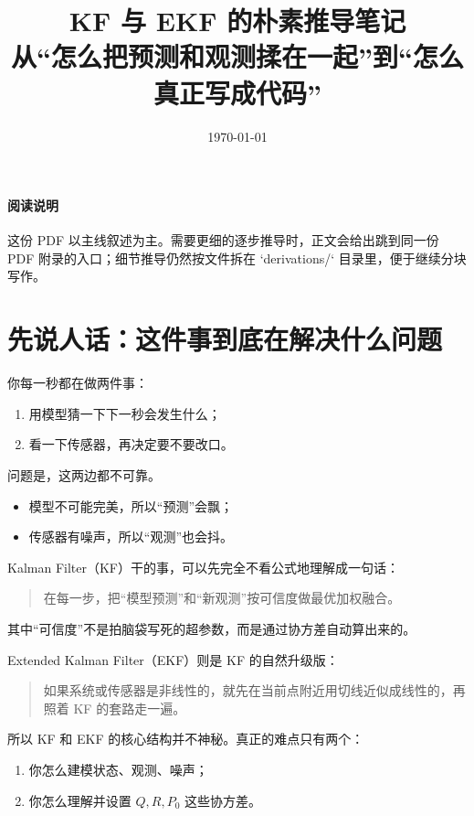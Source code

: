 \documentclass[12pt,a4paper]{ctexart}
\title{KF 与 EKF 的朴素推导笔记\\
\large 从“怎么把预测和观测揉在一起”到“怎么真正写成代码”}
\author{}
\date{\today}
\begin{document}
\maketitle

\tableofcontents

\paragraph{阅读说明}
这份 PDF 以主线叙述为主。需要更细的逐步推导时，正文会给出跳到同一份 PDF 附录的入口；细节推导仍然按文件拆在 `derivations/` 目录里，便于继续分块写作。

\section{先说人话：这件事到底在解决什么问题}

你每一秒都在做两件事：

\begin{enumerate}
  \item 用模型猜一下下一秒会发生什么；
  \item 看一下传感器，再决定要不要改口。
\end{enumerate}

问题是，这两边都不可靠。

\begin{itemize}
  \item 模型不可能完美，所以“预测”会飘；
  \item 传感器有噪声，所以“观测”也会抖。
\end{itemize}

Kalman Filter（KF）干的事，可以先完全不看公式地理解成一句话：

\begin{quote}
在每一步，把“模型预测”和“新观测”按可信度做最优加权融合。
\end{quote}

其中“可信度”不是拍脑袋写死的超参数，而是通过协方差自动算出来的。

Extended Kalman Filter（EKF）则是 KF 的自然升级版：

\begin{quote}
如果系统或传感器是非线性的，就先在当前点附近用切线近似成线性的，再照着 KF 的套路走一遍。
\end{quote}

所以 KF 和 EKF 的核心结构并不神秘。真正的难点只有两个：

\begin{enumerate}
  \item 你怎么建模状态、观测、噪声；
  \item 你怎么理解并设置 \(Q, R, P_0\) 这些协方差。
\end{enumerate}
\end{document}
